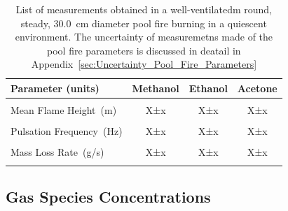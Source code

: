 \documentclass[12pt]{article}
\newcommand*\chem[1]{\ensuremath{\mathrm{#1}}}
\begin{document}
\begin{table}[!]
\caption{List of measurements obtained in a well-ventilatedm round, steady, 30.0~\si{cm} diameter pool fire burning in a quiescent environment. The uncertainty of measuremetns made of the pool fire parameters is discussed in deatail in Appendix~\ref{sec:Uncertainty_Pool_Fire_Parameters}}
\label{tab:Pool_Fire_Parameters_Table}
\centering
	\footnotesize
	\begin{tabular}{lccc}
			\hline
\textbf{Parameter (units)} &\textbf{Methanol}& \textbf{Ethanol}& \textbf{Acetone}\\
\hline
\\[0.01cm]
Mean Flame Height~(\si{m})	&	X±x	&	X±x	&	X±x\\
\\[0.01cm]
Pulsation Frequency~(\si{Hz}) 	&	X±x	&	X±x	&	X±x\\
\\[0.01cm]
Mass Loss Rate~(\si{g/s})		&	X±x	&	X±x	&	X±x\\
\\[0.01cm]
\hline
\end{tabular}
\end{table}

\subsection{Gas Species Concentrations}
\label{ssec:Gas_Species_Concentrations}

\end{document}
